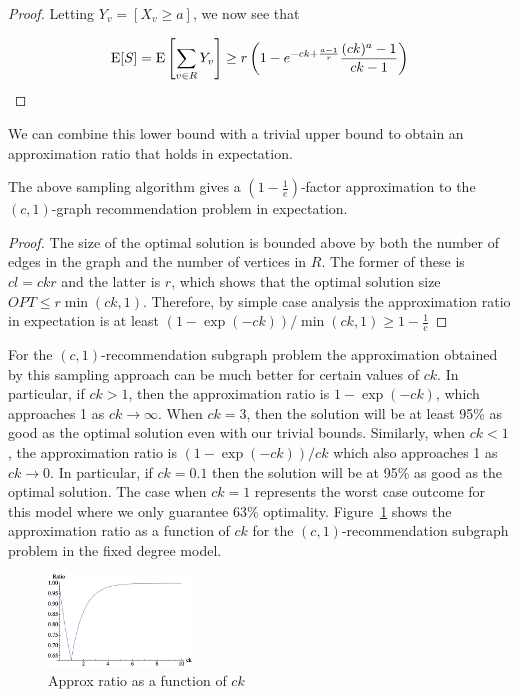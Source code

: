 \begin{proof}
Letting $Y_v = \left[X_v \geq a\right]$, we now see that

\[ \text{E}[S] = \text{E}\left[\sum_{v\in R} Y_v\right] \geq r\left(1-e^{-ck+\frac{a-1}{r}} \frac{(ck)^a-1}{ck-1}\right) \]
\end{proof} \vspace{-.2cm}

We can combine this lower bound with a trivial upper bound to obtain an
approximation ratio that holds in expectation.

\begin{thm}
The above sampling algorithm gives a $\left(1-\frac1e\right)$-factor approximation to the $(c,1)$-graph recommendation problem in expectation.
\end{thm}
\begin{proof}
The size of the optimal solution is bounded above by both the number
of edges in the graph and the number of vertices in $R$. The former of
these is $cl=ckr$ and the latter is $r$, which shows that the optimal solution size
$OPT \leq
r\min(ck,1)$. Therefore, by simple case analysis the approximation ratio
in expectation is at least $({1-\exp(-ck)})/\min(ck,1) \geq 1-\frac{1}{e} $
\end{proof}


For the $(c, 1)$-recommendation subgraph problem the approximation obtained by this sampling approach can be much better for certain values of $ck$. In particular,
if $ck>1$, then the approximation ratio is $1-\exp(-ck)$, which
approaches 1 as $ck\to\infty$. When $ck=3$, then the
solution will be at least 95\% as good as the optimal solution even
with our trivial bounds. Similarly, when $ck<1$, the approximation
ratio is $(1-\exp(-ck))/ck$ which also approaches 1 as $ck\to 0$. In
particular, if $ck=0.1$ then the solution will be at 95\% as good as
the optimal solution. The case when $ck=1$ represents the
worst case outcome for this model where we only guarantee 63\%
optimality. Figure~\ref{fig:simple_approx} shows the approximation ratio as a
function of $ck$ for the $(c,1)$-recommendation subgraph problem in the fixed degree model.\vs

\begin{figure}[H]
  \centering
  \includegraphics[width=0.34\textwidth]{images/sri_Original.png}
  \caption{Approx ratio as a function of $ck$ }\label{fig:simple_approx}
\end{figure}

